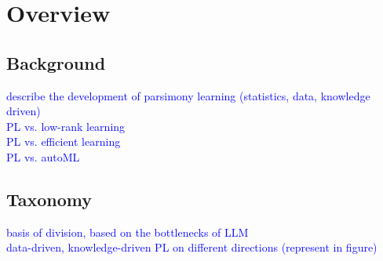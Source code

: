 

\section{Overview}

\subsection{Background}
\textcolor{blue}{describe the development of parsimony learning  (statistics, data, knowledge driven)}\\
\textcolor{blue}{PL vs. low-rank learning}\\
\textcolor{blue}{PL vs. efficient learning}\\
\textcolor{blue}{PL vs. autoML}\\






\subsection{Taxonomy}
\textcolor{blue}{basis of division, based on the bottlenecks of LLM}\\
\textcolor{blue}{data-driven, knowledge-driven PL on different directions (represent in figure)}
